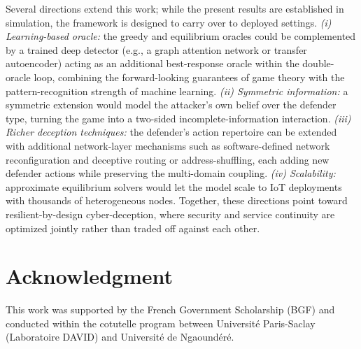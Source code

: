 \documentclass[conference]{IEEEtran}
\begin{document}
Several directions extend this work; while the present results are established
in simulation, the framework is designed to carry over to deployed settings.
\emph{(i) Learning-based oracle:} the
greedy and equilibrium oracles could be complemented by a trained deep detector
(e.g., a graph attention network or transfer autoencoder) acting as an
additional best-response oracle within the double-oracle loop, combining the
forward-looking guarantees of game theory with the pattern-recognition strength
of machine learning. \emph{(ii) Symmetric information:} a symmetric extension
would model the attacker's own belief over the defender
type, turning the game into a two-sided incomplete-information interaction.
\emph{(iii) Richer deception techniques:} the defender's action repertoire can be
extended with additional network-layer mechanisms such as software-defined
network reconfiguration and deceptive routing or address-shuffling, each adding
new defender actions while preserving the
multi-domain coupling. \emph{(iv) Scalability:} approximate equilibrium solvers
would let the model scale to IoT deployments with thousands of heterogeneous
nodes. Together, these directions point toward resilient-by-design
cyber-deception, where security and service continuity are optimized jointly
rather than traded off against each other.

\section*{Acknowledgment}
This work was supported by the French Government Scholarship (BGF) and conducted
within the cotutelle program between Universit\'e Paris-Saclay (Laboratoire
DAVID) and Universit\'e de Ngaound\'er\'e.



\end{document}

